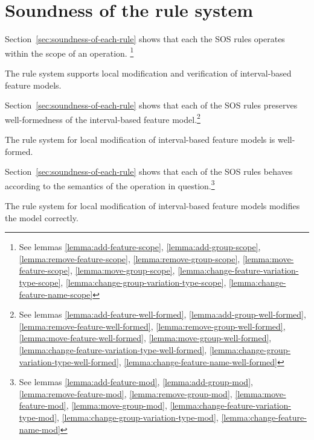 \section{Soundness of the rule system}
Section~\vref{sec:soundness-of-each-rule} shows that each the SOS rules operates within the scope of an operation. \footnote{See lemmas \vref{lemma:add-feature-scope}, \vref{lemma:add-group-scope}, \vref{lemma:remove-feature-scope}, \vref{lemma:remove-group-scope}, \vref{lemma:move-feature-scope}, \vref{lemma:move-group-scope}, \vref{lemma:change-feature-variation-type-scope}, \vref{lemma:change-group-variation-type-scope}, \vref{lemma:change-feature-name-scope}}
\\
\begin{theorem}
  The rule system supports local modification and verification of interval-based feature models.
\end{theorem}

Section~\vref{sec:soundness-of-each-rule} shows that each of the SOS rules preserves well-formedness of the interval-based feature model.\footnote{See lemmas \vref{lemma:add-feature-well-formed}, \vref{lemma:add-group-well-formed}, \vref{lemma:remove-feature-well-formed}, \vref{lemma:remove-group-well-formed}, \vref{lemma:move-feature-well-formed}, \vref{lemma:move-group-well-formed}, \vref{lemma:change-feature-variation-type-well-formed}, \vref{lemma:change-group-variation-type-well-formed}, \vref{lemma:change-feature-name-well-formed}}
\\
\begin{theorem}
  The rule system for local modification of interval-based feature models is well-formed.
\end{theorem}

Section~\vref{sec:soundness-of-each-rule} shows that each of the SOS rules behaves according to the semantics of the operation in question.\footnote{See lemmas \vref{lemma:add-feature-mod}, \vref{lemma:add-group-mod}, \vref{lemma:remove-feature-mod}, \vref{lemma:remove-group-mod}, \vref{lemma:move-feature-mod}, \vref{lemma:move-group-mod}, \vref{lemma:change-feature-variation-type-mod}, \vref{lemma:change-group-variation-type-mod}, \vref{lemma:change-feature-name-mod}}
\\
\begin{theorem}
  The rule system for local modification of interval-based feature models modifies the model correctly.
\end{theorem}
